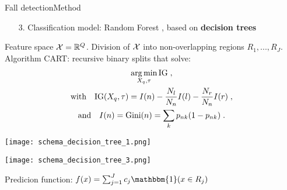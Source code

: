 \begin{frame}{Fall detection}{Method}
\begin{minipage}[t]{0.49\linewidth}
    \vspace{3cm}
    \pause[3]
    \begin{enumerate}
        \item[3.] Classification model: Random Forest \cite{Breiman2001}, based on \textbf{decision trees}
        
    \end{enumerate}
\end{minipage}\hfill
\begin{minipage}[t]{0.49\linewidth}
    \vspace{0pt}
    \begin{tcolorbox}[title=Decision tree,size=title,boxrule=0.2pt]
    \small
    Feature space $\mathcal{X} = \mathbb{R}^Q$.
    Division of $\mathcal{X}$ into non-overlapping regions $R_1,...,R_J$.
    Algorithm CART: recursive binary splits \cite{breiman84} that solve:
    \begin{gather*}
        \operatorname*{arg\,min}_{X_{q}, \tau} \mathrm{IG}\;, \\
        \text{with} \quad \mathrm{IG}(X_{q}, \tau) = I(n) - \frac{N_{l}}{N_n}I(l) - \frac{N_{r}}{N_{n}}I(r)\;,\\
        \text{and} \quad I(n) = \mathrm{Gini}(n) = \sum_{k}p_{nk}(1-p_{nk})\;.
    \end{gather*}
    \end{tcolorbox}
    \begin{minipage}[t]{0.49\linewidth}
        \vspace{-5pt}
        \centering
        \texttt{[image: schema\_decision\_tree\_1.png]}\\
    \end{minipage}
    \begin{minipage}[t]{0.49\linewidth}
        \vspace{-5pt}
        \centering
        \texttt{[image: schema\_decision\_tree\_3.png]}\\
    \end{minipage}
    \centering
    \small
    Predicion function:\;
    $f(x) = \sum_{j=1}^{J}c_{j}\mathbbm{1}(x\in R_{j})$

\end{minipage}
\end{frame}

